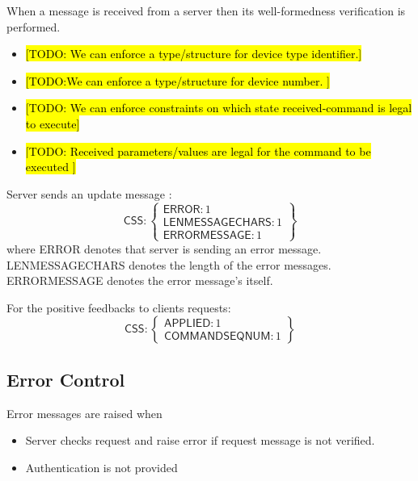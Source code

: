 When a message is received from a server then its well-formedness verification is performed.
\begin{itemize}
\item \hl{[TODO: We can enforce a type/structure for device type identifier.]}
\item \hl{[TODO:We can enforce a type/structure for device number. ]}
\item \hl{[TODO: We can enforce constraints on which state received-command is legal to execute]}
  \item \hl{[TODO: Received parameters/values are legal for the command to be executed ]}
\end{itemize}

Server sends an update message :
\[
\textsf{CSS}:\left\{ \begin{array}{ll}  \textsf{ERROR}:1\\
                                      \textsf{LENMESSAGECHARS}:1 \\
                                       \textsf{ERRORMESSAGE}:1 

           \end{array} \right\}
\]
where \textsf{ERROR} denotes that server is sending an error message. \textsf{LENMESSAGECHARS} denotes the length of the error messages. \textsf{ERRORMESSAGE} denotes the error message's itself.

For the positive feedbacks to clients requests:
\[\textsf{CSS} : \left\{ \begin{array}{ll}  \textsf{APPLIED}:1\\
                                             \textsf{COMMANDSEQNUM}:1
\end{array} \right\}
\]

\subsection{Error Control}
\label{sec:pdus:err}
Error messages are raised when
\begin{itemize}
\item Server checks request and raise error if request message is not verified.
\item Authentication is not provided
  \end{itemize}
